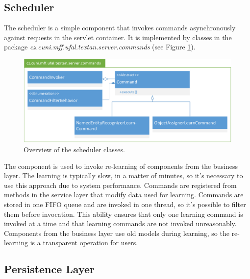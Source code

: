 \subsection{Scheduler}
The scheduler is a simple component that invokes commands asynchronously against
requests in the servlet container. It is implemented by classes in the package
\emph{cz.\-cuni.\-mff.\-ufal.\-textan.\-server.\-commands} (see Figure
\ref{fig:CommandsOverview}).

\begin{figure}[!htb]
        \centering
        \includegraphics[width=\textwidth]{Images/Commands}
        \caption{Overview of the scheduler classes.}
        \label{fig:CommandsOverview}
\end{figure}

The component is used to invoke re-learning of components from the business
layer. The learning is typically slow, in a matter of minutes, so it's necessary
to use this approach due to system performance. Commands are registered from
methods in the service layer that modify data used for learning. Commands are
stored in one FIFO queue and are invoked in one thread, so it's possible to
filter them before invocation. This ability ensures that only one learning
command is invoked at a time and that learning commands are not invoked
unreasonably. Components from the business layer use old models during learning,
so the re-learning is a transparent operation for users.

\subsection{Persistence Layer}
\label{sec:PersistentLayer}


